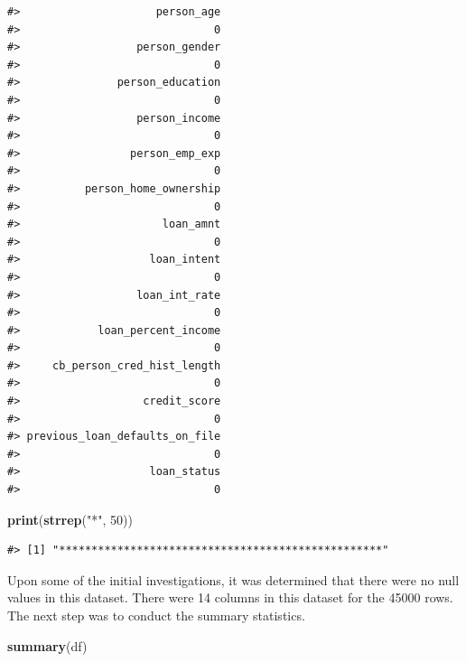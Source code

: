\documentclass[
  10pt,
]{article}
\newenvironment{Shaded}{\begin{snugshade}}{\end{snugshade}}
\newcommand{\DecValTok}[1]{\textcolor[rgb]{0.00,0.00,0.81}{#1}}
\newcommand{\FunctionTok}[1]{\textcolor[rgb]{0.13,0.29,0.53}{\textbf{#1}}}
\newcommand{\NormalTok}[1]{#1}
\newcommand{\StringTok}[1]{\textcolor[rgb]{0.31,0.60,0.02}{#1}}
\begin{document}
\begin{verbatim}
#>                     person_age 
#>                              0 
#>                  person_gender 
#>                              0 
#>               person_education 
#>                              0 
#>                  person_income 
#>                              0 
#>                 person_emp_exp 
#>                              0 
#>          person_home_ownership 
#>                              0 
#>                      loan_amnt 
#>                              0 
#>                    loan_intent 
#>                              0 
#>                  loan_int_rate 
#>                              0 
#>            loan_percent_income 
#>                              0 
#>     cb_person_cred_hist_length 
#>                              0 
#>                   credit_score 
#>                              0 
#> previous_loan_defaults_on_file 
#>                              0 
#>                    loan_status 
#>                              0
\end{verbatim}

\begin{Shaded}
\begin{Highlighting}[]
\FunctionTok{print}\NormalTok{(}\FunctionTok{strrep}\NormalTok{(}\StringTok{"*"}\NormalTok{, }\DecValTok{50}\NormalTok{))}
\end{Highlighting}
\end{Shaded}

\begin{verbatim}
#> [1] "**************************************************"
\end{verbatim}

Upon some of the initial investigations, it was determined that there
were no null values in this dataset. There were 14 columns in this
dataset for the 45000 rows. The next step was to conduct the summary
statistics.\\

\begin{Shaded}
\begin{Highlighting}[]
\FunctionTok{summary}\NormalTok{(df)}
\end{Highlighting}
\end{Shaded}
\end{document}
